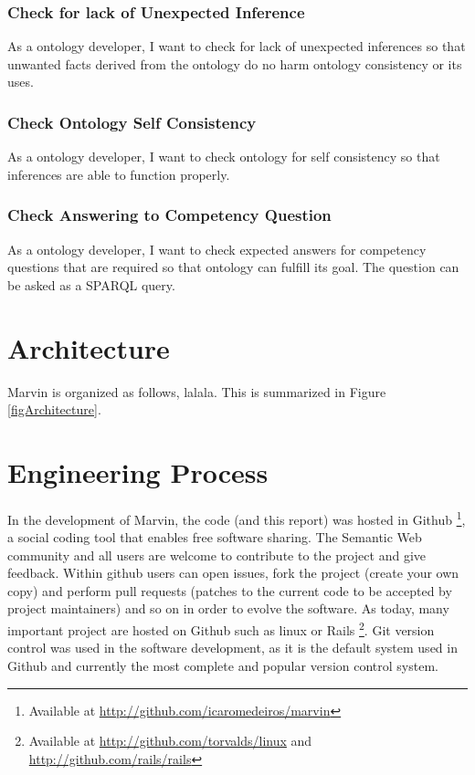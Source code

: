 \documentclass{report}
\begin{document}
\subsubsection{Check for lack of Unexpected Inference}

As a ontology developer, I want to check for lack of unexpected inferences so that unwanted facts
derived from the ontology do no harm ontology consistency or its uses.

\subsubsection{Check Ontology Self Consistency}

As a ontology developer, I want to check ontology for self consistency so that inferences are able to
function properly.

\subsubsection{Check Answering to Competency Question}

As a ontology developer, I want to check expected answers for competency questions that are required
so that ontology can fulfill its goal. The question can be asked as a SPARQL query.

\section{Architecture}

Marvin is organized as follows, lalala. This is summarized in Figure \ref{figArchitecture}.


\section{Engineering Process}

In the development of Marvin, the code (and this report) was hosted in Github
\footnote{Available at \url{http://github.com/icaromedeiros/marvin}}, a social coding tool that enables free software
sharing. The Semantic Web community and all users are welcome to contribute to the project and give feedback. Within
github users can open issues, fork the project (create your own copy) and perform pull requests (patches to the
current code to be accepted by project maintainers) and so on in order to evolve the software. As today, many
important project are hosted on Github such as linux or Rails \footnote{Available at \url{http://github.com/torvalds/linux}
and \url{http://github.com/rails/rails}}. Git version control was used in the software development, as it is the
default system used in Github and currently the most complete and popular version control system.
\end{document}

